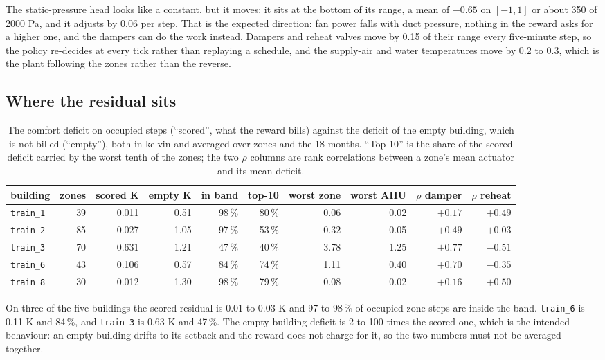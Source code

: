\documentclass{article}
\begin{document}
The static-pressure head looks like a constant, but it moves: it sits at the bottom of its range, a mean of $-0.65$ on $[-1,1]$ or about 350 of 2000 Pa, and it adjusts by 0.06 per step. That is the expected direction: fan power falls with duct pressure, nothing in the reward asks for a higher one, and the dampers can do the work instead. Dampers and reheat valves move by 0.15 of their range every five-minute step, so the policy re-decides at every tick rather than replaying a schedule, and the supply-air and water temperatures move by 0.2 to 0.3, which is the plant following the zones rather than the reverse.

\subsection{Where the residual sits}

\begin{table}[h!]
\centering
\footnotesize
\setlength{\tabcolsep}{3.4pt}
\begin{tabular}{@{}lrrrrrrrrr@{}}
\toprule
building & zones & scored K & empty K & in band & top-10 & worst zone & worst AHU & $\rho$ damper & $\rho$ reheat \\
\midrule
\texttt{train\_1} & 39 & 0.011 & 0.51 & 98\,\% & 80\,\% & 0.06 & 0.02 & $+0.17$ & $+0.49$ \\
\texttt{train\_2} & 85 & 0.027 & 1.05 & 97\,\% & 53\,\% & 0.32 & 0.05 & $+0.49$ & $+0.03$ \\
\texttt{train\_3} & 70 & 0.631 & 1.21 & 47\,\% & 40\,\% & 3.78 & 1.25 & $+0.77$ & $-0.51$ \\
\texttt{train\_6} & 43 & 0.106 & 0.57 & 84\,\% & 74\,\% & 1.11 & 0.40 & $+0.70$ & $-0.35$ \\
\texttt{train\_8} & 30 & 0.012 & 1.30 & 98\,\% & 79\,\% & 0.08 & 0.02 & $+0.16$ & $+0.50$ \\
\bottomrule
\end{tabular}
\vspace{4pt}
\caption{The comfort deficit on occupied steps (``scored'', what the reward bills) against the deficit of the empty building, which is not billed (``empty''), both in kelvin and averaged over zones and the 18 months. ``Top-10'' is the share of the scored deficit carried by the worst tenth of the zones; the two $\rho$ columns are rank correlations between a zone's mean actuator and its mean deficit.}
\label{tab:app_zones}
\end{table}

On three of the five buildings the scored residual is 0.01 to 0.03 K and 97 to 98\,\% of occupied zone-steps are inside the band. \texttt{train\_6} is 0.11 K and 84\,\%, and \texttt{train\_3} is 0.63 K and 47\,\%. The empty-building deficit is 2 to 100 times the scored one, which is the intended behaviour: an empty building drifts to its setback and the reward does not charge for it, so the two numbers must not be averaged together.
\end{document}
